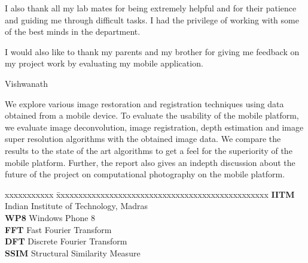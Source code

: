 \documentclass[BTech]{iitmdiss}
\begin{document}
\noindent I also thank all my lab mates for being extremely helpful and
 for their patience and guiding me through difficult tasks. I had the
  privilege of working with some of the best minds in the department.

\noindent I would also like to thank my parents and my brother for 
giving me feedback on my project work by evaluating my mobile
 application.

\raggedright{Vishwanath}

\abstract
We explore various image restoration and registration techniques using 
data obtained from a mobile device. To evaluate the usability of the 
mobile platform, we evaluate image deconvolution, image registration,
depth estimation and image super resolution algorithms with the obtained
image data. We compare the results to the state of the art algorithms
to get a feel for the superiority of the mobile platform. Further, the
report also gives an indepth discussion about the future of the project
on computational photography on the mobile platform.

\begin{singlespace}
\tableofcontents
\thispagestyle{empty}

\listoftables
{}
\listoffigures
{}
\end{singlespace}
\pagebreak

\abbreviations

\noindent 
\begin{tabbing}
xxxxxxxxxxx \= xxxxxxxxxxxxxxxxxxxxxxxxxxxxxxxxxxxxxxxxxxxxxxxx \kill
\textbf{IITM}   \> Indian Institute of Technology, Madras \\
\textbf{WP8}    \> Windows Phone 8 \\
\textbf{FFT}    \> Fast Fourier Transform \\
\textbf{DFT}    \> Discrete Fourier Transform \\
\textbf{SSIM}   \> Structural Similarity Measure \\
\end{tabbing}

\pagebreak

\end{document}
